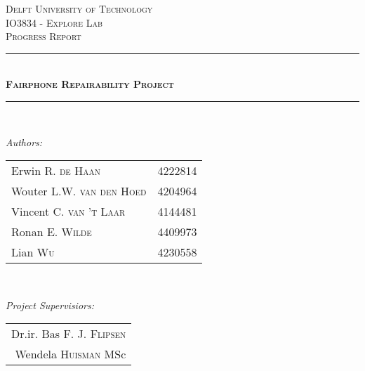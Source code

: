 \documentclass[final]{scrreprt} %
\begin{document}
\begin{titlepage}

\newcommand{\HRule}{\rule{\linewidth}{0.5mm}} %

\center %
 

\textsc{\LARGE Delft University of Technology}\\[1.5cm] %
\textsc{\Large IO3834 - Explore Lab}\\[0.5cm] %
\textsc{\large Progress Report}\\[0.5cm] %


\HRule \\[0.4cm]
\textsc{\huge \bfseries Fairphone Repairability Project}\\[0.2cm] %
\HRule \\[1.5cm]
 

\begin{minipage}{0.45\textwidth}
\begin{flushleft} \large
\emph{Authors:}\\
\begin{tabular}{ll}
Erwin R. \textsc{de Haan} & 4222814\\
Wouter L.W. \textsc{van den Hoed} & 4204964 \\
Vincent C. \textsc{van 't Laar} & 4144481 \\
Ronan E. \textsc{Wilde} & 4409973 \\
Lian \textsc{Wu} & 4230558 \\
\end{tabular}

\end{flushleft}
\end{minipage}
~
\begin{minipage}{0.45\textwidth}
\begin{flushright} \large
\emph{Project Supervisiors:} \\
\begin{tabular}{r}
Dr.ir. Bas F. J. \textsc{Flipsen}\\
Wendela \textsc{Huisman} MSc\\
\end{tabular}
\end{flushright}
\end{minipage}\\[1.5cm]


\end{titlepage}
\end{document}
